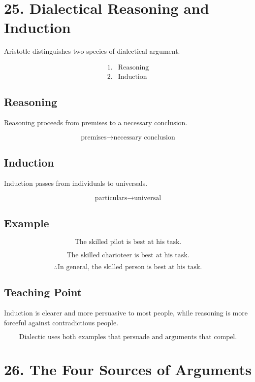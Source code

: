 \documentclass[12pt]{article}
\begin{document}
\section*{25. Dialectical Reasoning and Induction}

Aristotle distinguishes two species of dialectical argument.

\[
\begin{array}{ll}
1. & \text{Reasoning} \\
2. & \text{Induction}
\end{array}
\]

\subsection*{Reasoning}

Reasoning proceeds from premises to a necessary conclusion.

\[
\text{premises} \rightarrow \text{necessary conclusion}
\]

\subsection*{Induction}

Induction passes from individuals to universals.

\[
\text{particulars} \rightarrow \text{universal}
\]

\subsection*{Example}

\[
\text{The skilled pilot is best at his task.}
\]

\[
\text{The skilled charioteer is best at his task.}
\]

\[
\therefore \text{In general, the skilled person is best at his task.}
\]

\subsection*{Teaching Point}

Induction is clearer and more persuasive to most people, while reasoning is
more forceful against contradictious people.

\[
\boxed{
\text{Dialectic uses both examples that persuade and arguments that compel.}
}
\]

\section*{26. The Four Sources of Arguments}
\end{document}
